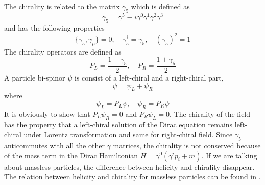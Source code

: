 \documentclass[12pt]{report}
\begin{document}
The chirality is related to the matrix $\gamma_{5}$ which is defined as
\begin{equation}
\gamma_{5} = \gamma^{5} \equiv i \gamma^{0} \gamma^{1} \gamma^{2} \gamma^{3}
\end{equation}
and has the following properties
\begin{equation}
\{ \gamma_{5}, \gamma_{\mu} \} = 0, \quad 
\gamma_{5}^{\dagger} = \gamma_{5}, \quad 
(\gamma_{5})^{2} = 1
\end{equation}
The chirality operators are defined as
\begin{equation}
P_{L} = \frac{1 - \gamma_{5}}{2}, \quad 
P_{R} = \frac{1 + \gamma_{5}}{2}
\end{equation}
A particle bi-spinor $\psi$ is consist of a left-chiral and a right-chiral part,
\begin{equation}
\psi = \psi_{L} + \psi_{R}
\end{equation}
where
\begin{equation}
\psi_{L} = P_{L} \psi, \quad 
\psi_{R} = P_{R} \psi
\end{equation}
It is obviously to show that $P_{L} \psi_{R} = 0$ and $P_{R} \psi_{L} = 0$.
The chirality of the field has the property that a left-chiral solution of the Dirac equation remains left-chiral under Lorentz transformation and same for right-chiral field.
Since $\gamma_{5}$ anticommutes with all the other $\gamma$ matrices, the chirality is not conserved because of the mass term in the Dirac Hamiltonian $H = \gamma^{0} (\gamma^{i} p_{i} + m)$.
If we are talking about massless particles, the difference between helicity and chirality disappear.
The relation between helicity and chirality for massless particles can be found in \cite{arXiv:1006.1718v2}.
\end{document}
